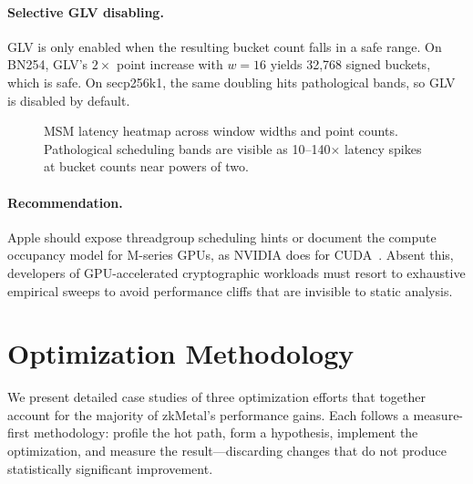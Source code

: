 \paragraph{Selective GLV disabling.}
GLV is only enabled when the resulting bucket count falls in a safe range. On
BN254, GLV's $2\times$ point increase with $w{=}16$ yields 32{,}768 signed
buckets, which is safe. On secp256k1, the same doubling hits pathological bands,
so GLV is disabled by default.

\begin{figure}[t]
\centering
{}
\caption{MSM latency heatmap across window widths and point counts.
  Pathological scheduling bands are visible as 10--140$\times$ latency spikes
  at bucket counts near powers of two.}
\label{fig:heatmap}
\end{figure}

\paragraph{Recommendation.}
Apple should expose threadgroup scheduling hints or document the compute
occupancy model for M-series GPUs, as NVIDIA does for
CUDA~\cite{cuda-occupancy}. Absent this, developers of GPU-accelerated
cryptographic workloads must resort to exhaustive empirical sweeps to avoid
performance cliffs that are invisible to static analysis.

\section{Optimization Methodology}
\label{sec:optimization}

We present detailed case studies of three optimization efforts that together
account for the majority of zkMetal's performance gains. Each follows a
measure-first methodology: profile the hot path, form a hypothesis, implement
the optimization, and measure the result---discarding changes that do not
produce statistically significant improvement.

